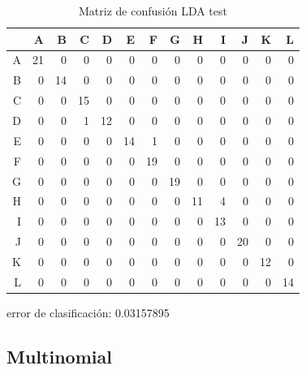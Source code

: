 \documentclass[pdf]{beamer}
\begin{document}
\begin{frame}
 \begin{table}[ht]
 \begin{adjustbox}{width= 3.5in,center}
\centering
\begin{tabular}{rrrrrrrrrrrrr}
  \hline
 & A & B & C & D & E & F & G & H & I & J & K & L \\ 
  \hline
A &  21 &   0 &   0 &   0 &   0 &   0 &   0 &   0 &   0 &   0 &   0 &   0 \\ 
  B &   0 &  14 &   0 &   0 &   0 &   0 &   0 &   0 &   0 &   0 &   0 &   0 \\ 
  C &   0 &   0 &  15 &   0 &   0 &   0 &   0 &   0 &   0 &   0 &   0 &   0 \\ 
  D &   0 &   0 &   1 &  12 &   0 &   0 &   0 &   0 &   0 &   0 &   0 &   0 \\ 
  E &   0 &   0 &   0 &   0 &  14 &   1 &   0 &   0 &   0 &   0 &   0 &   0 \\ 
  F &   0 &   0 &   0 &   0 &   0 &  19 &   0 &   0 &   0 &   0 &   0 &   0 \\ 
  G &   0 &   0 &   0 &   0 &   0 &   0 &  19 &   0 &   0 &   0 &   0 &   0 \\ 
  H &   0 &   0 &   0 &   0 &   0 &   0 &   0 &  11 &   4 &   0 &   0 &   0 \\ 
  I &   0 &   0 &   0 &   0 &   0 &   0 &   0 &   0 &  13 &   0 &   0 &   0 \\ 
  J &   0 &   0 &   0 &   0 &   0 &   0 &   0 &   0 &   0 &  20 &   0 &   0 \\ 
  K &   0 &   0 &   0 &   0 &   0 &   0 &   0 &   0 &   0 &   0 &  12 &   0 \\ 
  L &   0 &   0 &   0 &   0 &   0 &   0 &   0 &   0 &   0 &   0 &   0 &  14 \\ 
   \hline
\end{tabular}
\end{adjustbox}
	\label{tabla:confusionLDAtest}
	\caption{Matriz de confusión LDA test}
\end{table}
error de clasificación: 0.03157895
\end{frame}

\subsection{Multinomial}
\end{document}
